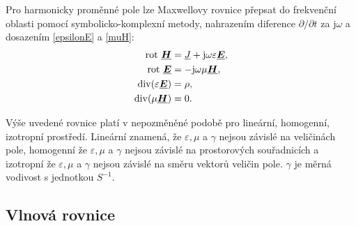 \documentclass[12pt,a4paper,oneside]{article}
\numberwithin{equation}{section} %
\numberwithin{figure}{section} %
\numberwithin{table}{section} %
\newcommand{\mj}{\mathrm{j}} %
\renewcommand{\vec}[1]{\mbox{\boldmath$#1$}} %
\newcommand{\faz}[1]{{\underline{#1}}} %
\newcommand{\rot}{\mathrm{rot}\ }
\begin{document}
Pro harmonicky proměnné pole lze Maxwellovy rovnice přepsat do frekvenční oblasti pomocí symbolicko-komplexní metody, nahrazením diference $\partial / \partial t$ za $\mj \omega$ a dosazením \ref{epsilonE} a \ref{muH}:
\begin{subequations}
\begin{align}
\rot \faz{\vec{H}} &= \faz{J} + \mj \omega \varepsilon \faz{\vec{E}},
\\
\rot \faz{\vec{E}} &= - \mj \omega \mu \faz{\vec{H}},
\\
\udiv (\varepsilon \faz{\vec{E}}) &= \rho,
\\
\udiv (\mu \faz{\vec{H}}) &= 0.
\end{align}
\end{subequations}

Výše uvedené rovnice platí v nepozměněné podobě pro lineární, homogenní, izotropní prostředí. Lineární znamená, že $\varepsilon , \mu$ a $\gamma$ nejsou závislé na veličinách pole, homogenní že $\varepsilon , \mu$ a $\gamma$ nejsou závislé na prostorových souřadnicích a izotropní že $\varepsilon , \mu$ a $\gamma$ nejsou závislé na směru vektorů veličin pole. $\gamma$ je měrná vodivost s jednotkou $S ^{-1}$.


\subsection{Vlnová rovnice}
\end{document}
